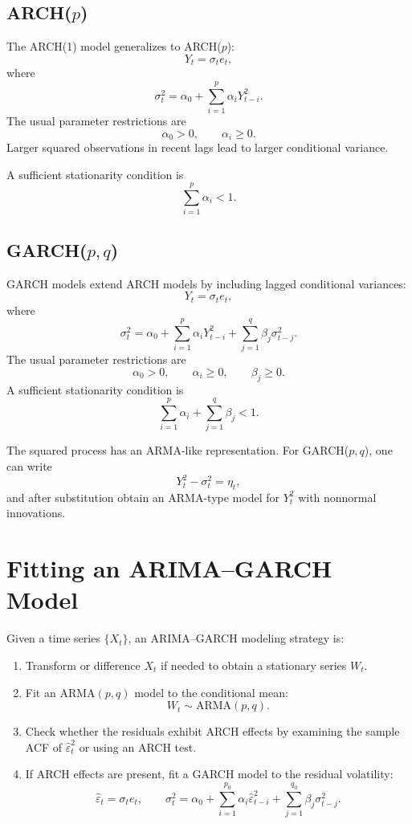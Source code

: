 \documentclass[12pt,oneside]{book}
\numberwithin{equation}{section}
\theoremstyle{definition}
\theoremstyle{plain}
\theoremstyle{remark}
\begin{document}
\subsection{ARCH($p$)}

The ARCH(1) model generalizes to ARCH($p$):
\[
Y_t=\sigma_te_t,
\]
where
\[
\sigma_t^2
=
\alpha_0+\sum_{i=1}^p\alpha_iY_{t-i}^2.
\]
The usual parameter restrictions are
\[
\alpha_0>0,
\qquad
\alpha_i\geq 0.
\]
Larger squared observations in recent lags lead to larger conditional variance.

A sufficient stationarity condition is
\[
\sum_{i=1}^p\alpha_i<1.
\]

\subsection{GARCH($p,q$)}

GARCH models extend ARCH models by including lagged conditional variances:
\[
Y_t=\sigma_te_t,
\]
where
\[
\sigma_t^2
=
\alpha_0
+
\sum_{i=1}^p\alpha_iY_{t-i}^2
+
\sum_{j=1}^q\beta_j\sigma_{t-j}^2.
\]
The usual parameter restrictions are
\[
\alpha_0>0,
\qquad
\alpha_i\geq 0,
\qquad
\beta_j\geq 0.
\]
A sufficient stationarity condition is
\[
\sum_{i=1}^p\alpha_i+\sum_{j=1}^q\beta_j<1.
\]

The squared process has an ARMA-like representation. For GARCH($p,q$), one can write
\[
Y_t^2-\sigma_t^2=\eta_t,
\]
and after substitution obtain an ARMA-type model for $Y_t^2$ with nonnormal innovations.

\section{Fitting an ARIMA--GARCH Model}

Given a time series $\{X_t\}$, an ARIMA--GARCH modeling strategy is:

\begin{enumerate}
\item Transform or difference $X_t$ if needed to obtain a stationary series $W_t$.
\item Fit an ARMA$(p,q)$ model to the conditional mean:
\[
W_t\sim \mathrm{ARMA}(p,q).
\]
\item Check whether the residuals exhibit ARCH effects by examining the sample ACF of $\widehat{\varepsilon}_t^2$ or using an ARCH test.
\item If ARCH effects are present, fit a GARCH model to the residual volatility:
\[
\widehat{\varepsilon}_t
=
\sigma_te_t,
\qquad
\sigma_t^2
=
\alpha_0+\sum_{i=1}^{p_0}\alpha_i\widehat{\varepsilon}_{t-i}^2
+
\sum_{j=1}^{q_0}\beta_j\sigma_{t-j}^2.
\]
\end{enumerate}
\end{document}
